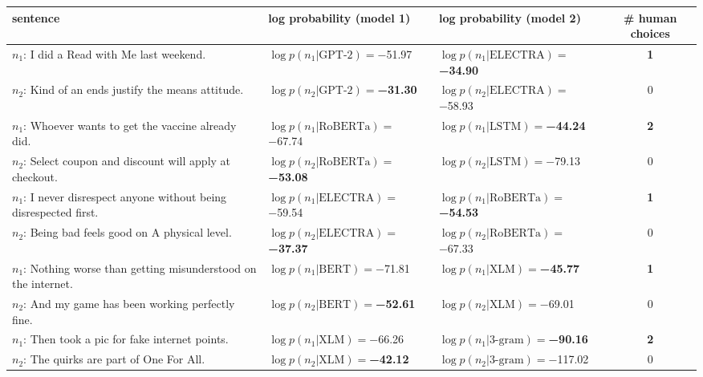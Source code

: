 \begin{tabularx}{\textwidth}{lllc}
\toprule
                                                           sentence &                               log probability (model 1) &                               log probability (model 2) &  \# human choices \\
\midrule
                          $n_1$: I did a Read with Me last weekend. &             $\log p(n_1 | \textrm{GPT-2})=$\num{-51.97} &  $\log p(n_1 | \textrm{ELECTRA})=$\textbf{\num{-34.90}} &  \textbf{\num{1}} \\
                 $n_2$: Kind of an ends justify the means attitude. &    $\log p(n_2 | \textrm{GPT-2})=$\textbf{\num{-31.30}} &           $\log p(n_2 | \textrm{ELECTRA})=$\num{-58.93} &           \num{0} \\\midrule
               $n_1$: Whoever wants to get the vaccine already did. &           $\log p(n_1 | \textrm{RoBERTa})=$\num{-67.74} &     $\log p(n_1 | \textrm{LSTM})=$\textbf{\num{-44.24}} &  \textbf{\num{2}} \\
          $n_2$: Select coupon and discount will apply at checkout. &  $\log p(n_2 | \textrm{RoBERTa})=$\textbf{\num{-53.08}} &              $\log p(n_2 | \textrm{LSTM})=$\num{-79.13} &           \num{0} \\\midrule
 $n_1$: I never disrespect anyone without being disrespected first. &           $\log p(n_1 | \textrm{ELECTRA})=$\num{-59.54} &  $\log p(n_1 | \textrm{RoBERTa})=$\textbf{\num{-54.53}} &  \textbf{\num{1}} \\
                   $n_2$: Being bad feels good on A physical level. &  $\log p(n_2 | \textrm{ELECTRA})=$\textbf{\num{-37.37}} &           $\log p(n_2 | \textrm{RoBERTa})=$\num{-67.33} &           \num{0} \\\midrule
   $n_1$: Nothing worse than getting misunderstood on the internet. &              $\log p(n_1 | \textrm{BERT})=$\num{-71.81} &      $\log p(n_1 | \textrm{XLM})=$\textbf{\num{-45.77}} &  \textbf{\num{1}} \\
                $n_2$: And my game has been working perfectly fine. &     $\log p(n_2 | \textrm{BERT})=$\textbf{\num{-52.61}} &               $\log p(n_2 | \textrm{XLM})=$\num{-69.01} &           \num{0} \\\midrule
                   $n_1$: Then took a pic for fake internet points. &               $\log p(n_1 | \textrm{XLM})=$\num{-66.26} &   $\log p(n_1 | \textrm{3-gram})=$\textbf{\num{-90.16}} &  \textbf{\num{2}} \\
                         $n_2$: The quirks are part of One For All. &      $\log p(n_2 | \textrm{XLM})=$\textbf{\num{-42.12}} &           $\log p(n_2 | \textrm{3-gram})=$\num{-117.02} &           \num{0} \\\midrule

\end{tabularx}
